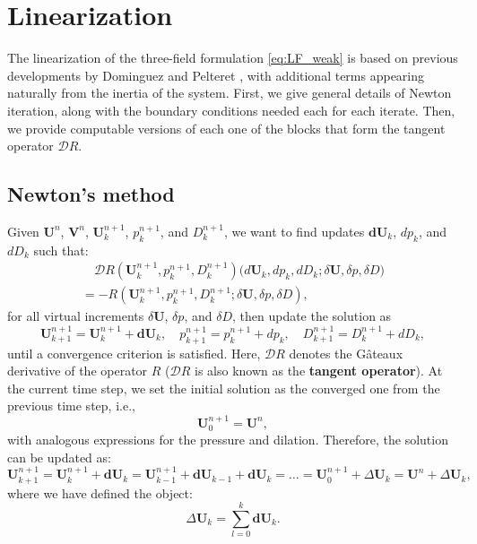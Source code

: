\documentclass{sfuthesis}
\numberwithin{equation}{section}
\numberwithin{figure}{chapter}
\numberwithin{table}{chapter}
\theoremstyle{definition}
\def\*#1{{\mathbf{#1}}} %
\renewcommand{\c}{\mathbbm{c}}
\begin{document}
\section{Linearization}

The linearization of the three-field formulation \eqref{eq:LF_weak} is based on previous developments by Dominguez \cite{Seba} and Pelteret \cite{PelteretThesis}, with additional terms appearing naturally from the inertia of the system. First, we give general details of Newton iteration, along with the boundary conditions needed each for each iterate. Then, we provide computable versions of each one of the blocks that form the tangent operator $\bm{\mathcal{D}}R$.

\subsection{Newton's method} \label{sec:newton_method}

Given $\*U^n$, $\*V^n$, $\*U^{n+1}_k$, $p^{n+1}_k$, and $D^{n+1}_k$, we want to find updates $\*d \*U_k$, $d p_k$, and $d D_k$ such that:
\begin{multline} \label{eq:newton}
    \quad \bm{\mathcal{D}}R(\*U^{n+1}_k, p^{n+1}_k, D^{n+1}_k) \Big(d \*U_k, d p_k, d D_k ; \delta \*U, \delta p, \delta D \Big) \\
    = - R(\*U^{n+1}_k, p^{n+1}_k, D^{n+1}_k ; \delta \*U, \delta p, \delta D), \quad
\end{multline}
for all virtual increments $\delta \*U$, $\delta p$, and $\delta D$, then update the solution as
\begin{equation} \label{eq:update_theory}
\*U^{n+1}_{k+1} = \*U^{n+1}_k + \*d \*U_k, \quad 
p^{n+1}_{k+1} = p^{n+1}_k + d p_k, \quad 
D^{n+1}_{k+1} = D^{n+1}_k + d D_k,
\end{equation}
until a convergence criterion is satisfied. Here, $\bm{\mathcal{D}} R$ denotes the G\^{a}teaux derivative of the operator $R$ ($\bm{\mathcal{D}} R$ is also known as the \textbf{tangent operator}). At the current time step, we set the initial solution as the converged one from the previous time step, i.e.,
\begin{equation}
\*U_0^{n+1} = \*U^n,
\end{equation}
with analogous expressions for the pressure and dilation. Therefore, the solution can be updated as:
\begin{equation} \label{eq:update_practice}
\*U^{n+1}_{k+1} = \*U^{n+1}_k + \*d\*U_k = \*U^{n+1}_{k-1} + \*d\*U_{k-1} + \*d \*U_k = \dots = \*U_0^{n+1} + \Delta \*U_k = \*U^n + \Delta \*U_k,
\end{equation}
where we have defined the object:
\begin{equation}
\Delta \*U_k = \sum_{l = 0}^k \*d \*U_k.
\end{equation}
\end{document}
